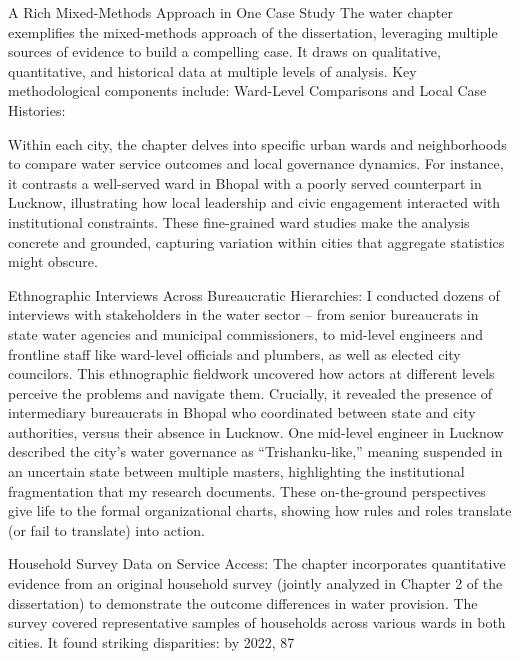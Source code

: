 A Rich Mixed-Methods Approach in One Case Study
The water chapter exemplifies the mixed-methods approach of the dissertation, leveraging multiple sources of evidence to build a compelling case. It draws on qualitative, quantitative, and historical data at multiple levels of analysis. Key methodological components include:
Ward-Level Comparisons and Local Case Histories: 

Within each city, the chapter delves into specific urban wards and neighborhoods to compare water service outcomes and local governance dynamics. For instance, it contrasts a well-served ward in Bhopal with a poorly served counterpart in Lucknow, illustrating how local leadership and civic engagement interacted with institutional constraints. These fine-grained ward studies make the analysis concrete and grounded, capturing variation within cities that aggregate statistics might obscure.


Ethnographic Interviews Across Bureaucratic Hierarchies: I conducted dozens of interviews with stakeholders in the water sector – from senior bureaucrats in state water agencies and municipal commissioners, to mid-level engineers and frontline staff like ward-level officials and plumbers, as well as elected city councilors. This ethnographic fieldwork uncovered how actors at different levels perceive the problems and navigate them. Crucially, it revealed the presence of intermediary bureaucrats in Bhopal who coordinated between state and city authorities, versus their absence in Lucknow. One mid-level engineer in Lucknow described the city’s water governance as “Trishanku-like,” meaning suspended in an uncertain state between multiple masters, highlighting the institutional fragmentation that my research documents. These on-the-ground perspectives give life to the formal organizational charts, showing how rules and roles translate (or fail to translate) into action.


Household Survey Data on Service Access: The chapter incorporates quantitative evidence from an original household survey (jointly analyzed in Chapter 2 of the dissertation) to demonstrate the outcome differences in water provision. The survey covered representative samples of households across various wards in both cities. It found striking disparities: by 2022, 87%


